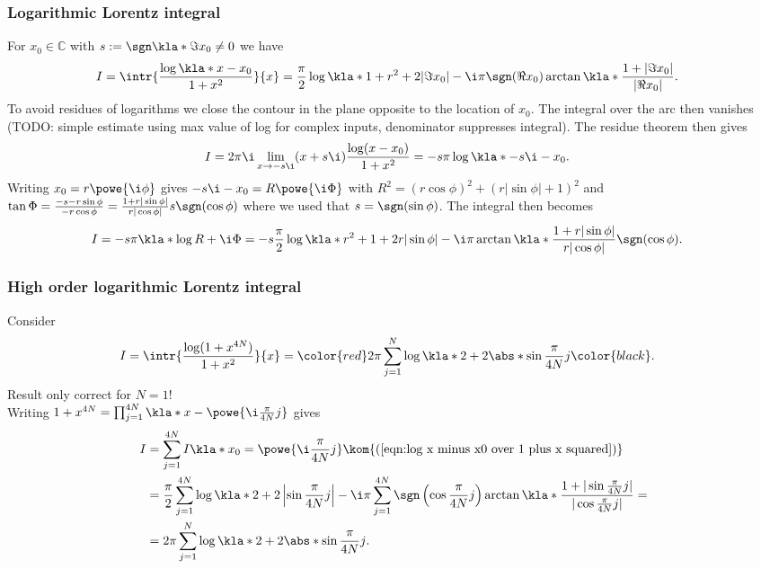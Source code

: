 \documentclass[english, parskip=full]{scrartcl}
\newcommand{\TODO}[1]{\color{red} #1 \color{black}}
\begin{document}
\subsubsection{Logarithmic Lorentz integral}
For $x_0\in\mathbb{C}$ with $s := \sgn \kla*{\Im x_0} \neq 0$ we have
\begin{align}
I &= \intr{\frac{\log \kla*{x - x_0} }{1 +x^2}}{x} = \frac{\pi}{2} \log \kla*{1 + r^2 + 2|\Im x_0|} - \i \pi \sgn (\Re x_0) \arctan \kla*{\frac{1 + |\Im x_0|}{|\Re x_0|}} . \label{eqn:log x minus x0 over 1 plus x squared}
\end{align}
To avoid residues of logarithms we close the contour in the plane opposite to the location of $x_0$.
The integral over the arc then vanishes (TODO: simple estimate using max value of log for complex inputs, denominator suppresses integral).
The residue theorem then gives
\begin{align}
I &= 2\pi\i \lim_{x \rightarrow -s\i} (x + s\i) \frac{\log (x - x_0)}{1 + x^2} = -s\pi \log \kla*{-s\i - x_0}.
\end{align}
Writing $x_0 = r \powe{\i \phi}$ gives $-s\i - x_0 = R\powe{\i \Phi}$ with $R^2 = (r\cos \phi)^2 + (r|\sin\phi| + 1)^2$ and $\tan\Phi = \frac{-s - r\sin \phi}{-r\cos\phi} = \frac{1 + r|\sin \phi|}{r|\cos\phi|} s \sgn (\cos \phi) $ where we used that $s = \sgn (\sin \phi)$.
The integral then becomes
\begin{align}
I &= -s\pi  \kla*{\log R + \i \Phi} = -s\frac{\pi}{2} \log \kla*{r^2 + 1 + 2r|\sin\phi|} -  \i\pi \arctan \kla*{\frac{1 + r|\sin\phi|}{r|\cos\phi|}} \sgn (\cos\phi) .
\end{align}
\subsubsection{High order logarithmic Lorentz integral}
Consider
\begin{align}
I &= \intr{\frac{\log (1 + x^{4N})}{1 + x^2}}{x} = \TODO{2\pi \sum_{j=1}^N \log \kla*{2 + 2 \abs*{\sin \frac{\pi}{4N}j}} } . \label{eqn:log 1 plus x to N over 1 plus x squared}
\end{align}
\TODO{Result only correct for $N=1$!}\\
Writing $1+x^{4N} = \prod_{j=1}^{4N} \kla*{x - \powe{\i \frac{\pi}{4N}j }} $ gives
\begin{align}
I &= \sum_{j=1}^{4N} I\kla*{x_0 = \powe{\i \frac{\pi}{4N}j}} \kom{(\ref{eqn:log x minus x0 over 1 plus x squared})} \\
&= \frac{\pi}{2} \sum_{j=1}^{4N} \log \kla*{2 + 2 \left\vert \sin \frac{\pi}{4N}j \right\vert} - \i\pi \sum_{j=1}^{4N} \sgn \left(\cos \frac{\pi}{4N}j \right) \arctan\kla*{\frac{1 + |\sin \frac{\pi}{4N}j|}{|\cos \frac{\pi}{4N}j|}} = \\
&= 2\pi \sum_{j=1}^N \log \kla*{2 + 2 \abs*{\sin \frac{\pi}{4N}j}}.
\end{align}
\end{document}
